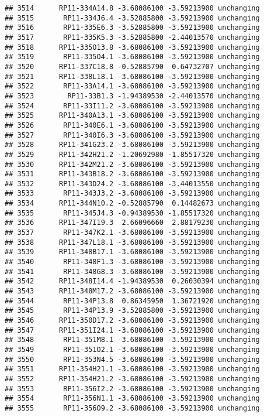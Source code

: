 \documentclass[]{article}
\begin{document}
\begin{verbatim}
## 3514      RP11-334A14.8 -3.68086100 -3.59213900 unchanging
## 3515       RP11-334J6.4 -3.52885800 -3.59213900 unchanging
## 3516       RP11-335E6.3 -3.52885800 -3.59213900 unchanging
## 3517       RP11-335K5.3 -3.52885800 -2.44013570 unchanging
## 3518      RP11-335O13.8 -3.68086100 -3.59213900 unchanging
## 3519       RP11-335O4.1 -3.68086100 -3.59213900 unchanging
## 3520      RP11-337C18.8 -0.52885790  0.64732707 unchanging
## 3521      RP11-338L18.1 -3.68086100 -3.59213900 unchanging
## 3522       RP11-33A14.1 -3.68086100 -3.59213900 unchanging
## 3523        RP11-33B1.3 -1.94389530 -2.44013570 unchanging
## 3524       RP11-33I11.2 -3.68086100 -3.59213900 unchanging
## 3525      RP11-340A13.1 -3.68086100 -3.59213900 unchanging
## 3526       RP11-340E6.1 -3.68086100 -3.59213900 unchanging
## 3527       RP11-340I6.3 -3.68086100 -3.59213900 unchanging
## 3528      RP11-341G23.2 -3.68086100 -3.59213900 unchanging
## 3529      RP11-342H21.2 -1.20692980 -1.85517320 unchanging
## 3530      RP11-342M21.2 -3.68086100 -3.59213900 unchanging
## 3531      RP11-343B18.2 -3.68086100 -3.59213900 unchanging
## 3532      RP11-343D24.2 -3.68086100 -3.44013550 unchanging
## 3533       RP11-343J3.2 -3.68086100 -3.59213900 unchanging
## 3534      RP11-344N10.2 -0.52885790  0.14482673 unchanging
## 3535       RP11-345J4.3 -0.94389530 -1.85517320 unchanging
## 3536      RP11-347I19.3  2.66096660  2.88179230 unchanging
## 3537       RP11-347K2.1 -3.68086100 -3.59213900 unchanging
## 3538      RP11-347L18.1 -3.68086100 -3.59213900 unchanging
## 3539      RP11-348B17.1 -3.68086100 -3.59213900 unchanging
## 3540       RP11-348F1.3 -3.68086100 -3.59213900 unchanging
## 3541       RP11-348G8.3 -3.68086100 -3.59213900 unchanging
## 3542      RP11-348I14.4 -1.94389530  0.26030394 unchanging
## 3543      RP11-348M17.2 -3.68086100 -3.59213900 unchanging
## 3544       RP11-34P13.8  0.86345950  1.36721920 unchanging
## 3545       RP11-34P13.9 -3.52885800 -3.59213900 unchanging
## 3546      RP11-350D17.2 -3.68086100 -3.59213900 unchanging
## 3547      RP11-351I24.1 -3.68086100 -3.59213900 unchanging
## 3548       RP11-351M8.1 -3.68086100 -3.59213900 unchanging
## 3549       RP11-351O2.1 -3.68086100 -3.59213900 unchanging
## 3550       RP11-353N4.5 -3.68086100 -3.59213900 unchanging
## 3551      RP11-354H21.1 -3.68086100 -3.59213900 unchanging
## 3552      RP11-354H21.2 -3.68086100 -3.59213900 unchanging
## 3553       RP11-356I2.2 -3.68086100 -3.59213900 unchanging
## 3554       RP11-356N1.1 -3.68086100 -3.59213900 unchanging
## 3555       RP11-356O9.2 -3.68086100 -3.59213900 unchanging

\end{verbatim}
\end{document}
